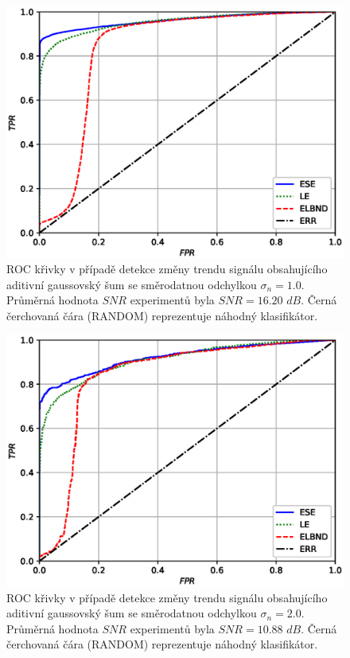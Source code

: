 \begin{figure}[ht!]
    \centering
    \includegraphics[scale=0.73]{IMG/appel_roc/roc_1.eps}
    \caption{ROC křivky v případě detekce změny trendu signálu obsahujícího aditivní gaussovský šum se směrodatnou odchylkou $\sigma_n=1.0$. Průměrná hodnota $SNR$ experimentů byla $SNR=16.20$ $dB$. Černá čerchovaná čára (RANDOM) reprezentuje náhodný klasifikátor.}
    \label{fig:roc_1}
\end{figure}
\begin{figure}[ht!]
    \centering
    \includegraphics[scale=0.73]{IMG/appel_roc/roc_2.eps}
    \caption{ROC křivky v případě detekce změny trendu signálu obsahujícího aditivní gaussovský šum se směrodatnou odchylkou $\sigma_n=2.0$. Průměrná hodnota $SNR$ experimentů byla $SNR=10.88$ $dB$. Černá čerchovaná čára (RANDOM) reprezentuje náhodný klasifikátor.}
    \label{fig:roc_2}
\end{figure}
